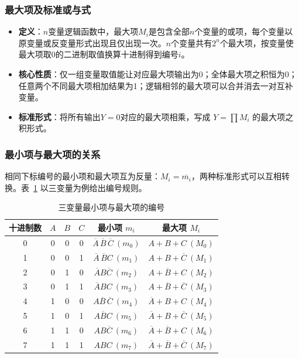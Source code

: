 \subsubsection{最大项及标准或与式}
\begin{itemize}
    \item \textbf{定义}：$n$变量逻辑函数中，最大项$M_i$是包含全部$n$个变量的或项，每个变量以原变量或反变量形式出现且仅出现一次。$n$个变量共有$2^n$个最大项，按变量使最大项取0的二进制取值换算十进制得到编号$i$。
    \item \textbf{核心性质}：仅一组变量取值能让对应最大项输出为0；全体最大项之积恒为0；任意两个不同最大项相加结果为1；逻辑相邻的最大项可以合并消去一对互补变量。
    \item \textbf{标准形式}：将所有输出$Y=0$对应的最大项相乘，写成 $Y=\prod M_i$ 的最大项之积形式。
\end{itemize}

\subsubsection{最小项与最大项的关系}
相同下标编号的最小项和最大项互为反量：$M_i=\overline{m_i}$，两种标准形式可以互相转换。表~\ref{tab:minmax3} 以三变量为例给出编号规则。

\begin{table}[!htbp]
    \centering
    \caption{三变量最小项与最大项的编号}
    \label{tab:minmax3}
    \begin{tabular}{@{}cccccc@{}}
        \toprule
        十进制数 & $A$ & $B$ & $C$ & 最小项 $m_i$ & 最大项 $M_i$ \\
        \midrule
        0 & 0 & 0 & 0 & $\overline{A}\,\overline{B}\,\overline{C}\ (m_0)$ & $A+B+C\ (M_0)$ \\
        1 & 0 & 0 & 1 & $\overline{A}\,\overline{B}C\ (m_1)$ & $A+B+\overline{C}\ (M_1)$ \\
        2 & 0 & 1 & 0 & $\overline{A}B\overline{C}\ (m_2)$ & $A+\overline{B}+C\ (M_2)$ \\
        3 & 0 & 1 & 1 & $\overline{A}BC\ (m_3)$ & $A+\overline{B}+\overline{C}\ (M_3)$ \\
        4 & 1 & 0 & 0 & $A\overline{B}\,\overline{C}\ (m_4)$ & $\overline{A}+B+C\ (M_4)$ \\
        5 & 1 & 0 & 1 & $A\overline{B}C\ (m_5)$ & $\overline{A}+B+\overline{C}\ (M_5)$ \\
        6 & 1 & 1 & 0 & $AB\overline{C}\ (m_6)$ & $\overline{A}+\overline{B}+C\ (M_6)$ \\
        7 & 1 & 1 & 1 & $ABC\ (m_7)$ & $\overline{A}+\overline{B}+\overline{C}\ (M_7)$ \\
        \bottomrule
    \end{tabular}
\end{table}

